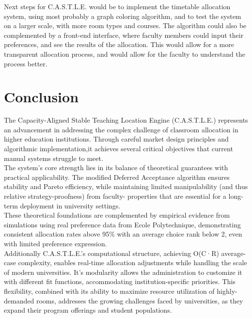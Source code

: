 \documentclass[a4paper, oneside]{article}
\theoremstyle{plain}
\newcommand{\castle}{C{\small.}A{\small.}S{\small.}T{\small.}L{\small.}E{\small.}}
\begin{document}
Next steps for \castle{} would be to implement the timetable allocation system, using most probably a graph coloring algorithm, and to test the system on a larger scale, with more room types and courses.
The algorithm could also be complemented by a front-end interface, where faculty members could input their preferences, and see the results of the allocation. This would allow for a more transparent
allocation process, and would allow for the faculty to understand the process better.
\pagebreak

\section*{Conclusion}

The Capacity-Aligned Stable Teaching Location Engine (\castle{}) represents an advancement in addressing the complex challenge of classroom allocation in higher education institutions.
Through careful market design principles and algorithmic implementation,it achieves several critical objectives that current manual systems struggle to meet.\\

The system's core strength lies in its balance of theoretical guarantees with practical applicability.
The modified Deferred Acceptance algorithm ensures stability and Pareto efficiency, while maintaining limited manipulability (and thus relative strategy-proofness)
from faculty- properties that are essential for a long-term deployment in university settings.\\

These theoretical foundations are complemented by empirical evidence
from simulations using real preference data from Ecole Polytechnique, demonstrating consistent allocation rates above 95\% with an average choice rank below 2,
even with limited preference expression.\\

Additionally \castle{}'s computational structure, achieving O(C·R) average-case complexity, enables real-time allocation adjustments while handling the scale of modern universities.
It's modularity allows the administration to customize it with different fit functions, accommodating institution-specific priorities.
This flexibility, combined with its ability to maximize resource utilization of highly-demanded rooms, addresses the growing challenges
faced by universities, as they expand their program offerings and student populations.\\
\end{document}
